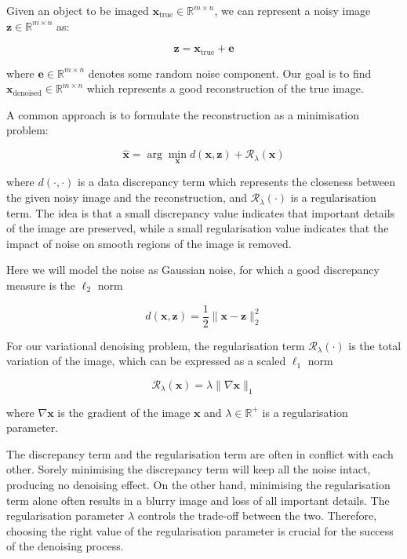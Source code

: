 \documentclass[12pt]{article}
\begin{document}
Given an object to be imaged $\mathbf{x}_{\text{true}} \in \mathbb{R}^{m \times n}$, we can represent a noisy image $\mathbf{z} \in \mathbb{R}^{m \times n}$ as:


\begin{equation}
  \mathbf{z} = \mathbf{x}_{\text{true}} + \mathbf{e}
\end{equation}
  
where 
$\mathbf{e} \in \mathbb{R}^{m \times n}$ denotes some random noise component.
Our goal is to find $\mathbf{x}_{\text{denoised}} \in \mathbb{R}^{m \times n}$ which represents a good reconstruction of the true image.

A common approach is to formulate the reconstruction as a minimisation problem:


\begin{equation}
  \hat{\mathbf{x}} = \arg \min_{\mathbf{x}} d(\mathbf{x}, \mathbf{z}) + \mathcal{R}_{\lambda}(\mathbf{x})
\end{equation}

where $d(\cdot, \cdot)$ is a data discrepancy term 
which represents the closeness between the given noisy image and the reconstruction, 
and $\mathcal{R}_{\lambda}(\cdot)$ is a regularisation term.
The idea is that a small discrepancy value indicates that important details of the image are preserved, while a small regularisation value indicates that the impact of noise on smooth regions of the image is removed.

Here we will model the noise as Gaussian noise, for which a good discrepancy measure is the $\ell_2$ norm

\begin{equation}
  d(\mathbf{x}, \mathbf{z}) = \frac{1}{2} \|\mathbf{x} - \mathbf{z}\|_2^2
\end{equation}

For our variational denoising problem, the regularisation term $\mathcal{R}_{\lambda}(\cdot)$ is the total variation of the image, which can be expressed as a scaled $\ell_1$ norm

\begin{equation}
  \mathcal{R}_{\lambda}(\mathbf{x}) = \lambda \| \nabla \mathbf{x} \|_1
\end{equation}

where $\nabla \mathbf{x}$ is the gradient of the image $\mathbf{x}$ and $\lambda \in \mathbb{R}^{+}$ is a regularisation parameter.

The discrepancy term and the regularisation term are often in conflict with each other. Sorely minimising the discrepancy term will keep all the noise intact, producing no denoising effect. On the other hand, minimising the regularisation term alone often results in a blurry image and loss of all important details. The regularisation parameter $\lambda$ controls the trade-off between the two. Therefore, choosing the right value of the regularisation parameter is crucial for the success of the denoising process.
\end{document}
